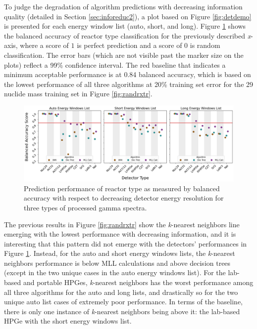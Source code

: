 
To judge the degradation of algorithm predictions with decreasing information
quality (detailed in Section \ref{sec:inforeduc2}), a plot based on Figure
\ref{fig:detdemo} is presented for each energy window list (auto, short, and
long).  Figure \ref{fig:rxtr} shows the balanced accuracy of reactor type
classification for the previously described \textit{x}-axis, where a score of
$1$ is perfect prediction and a score of $0$ is random classification. The
error bars (which are not visible past the marker size on the plots) reflect a
99\% confidence interval.  The red baseline that indicates a minimum acceptable
performance is at 0.84 balanced accuracy, which is based on the lowest
performance of all three algorithms at 20\% training set error for the 29
nuclide mass training set in Figure \ref{fig:randrxtr}.  

\begin{figure}[!htb]
  \centering
  \includegraphics[width=\textwidth]{./chapters/exp2/detector_preds_wrt_enlist_BalAcc_rxtr.png}
  \caption{Prediction performance of reactor type as measured by balanced 
           accuracy with respect to decreasing detector energy resolution 
           for three types of processed gamma spectra.}
  \label{fig:rxtr}
\end{figure}

The previous results in Figure \ref{fig:randrxtr} show the \textit{k}-nearest
neighbors line emerging with the lowest performance with decreasing
information, and it is interesting that this pattern did not emerge with the
detectors' performances in Figure \ref{fig:rxtr}.  Instead, for the auto and
short energy windows lists, the \textit{k}-nearest neighbors performance is
below \gls{MLL} calculations and above decision trees (except in the two unique
cases in the auto energy windows list).  For the lab-based and portable
\gls{HPGe}s, \textit{k}-nearest neighbors has the worst performance among all
three algorithms for the auto and long lists, and drastically so for the two
unique auto list cases of extremely poor performance.  In terms of the
baseline, there is only one instance of \textit{k}-nearest neighbors being
above it: the lab-based \gls{HPGe} with the short energy windows list. 

